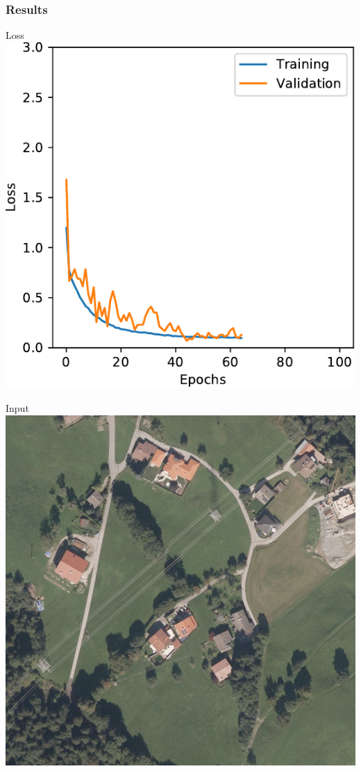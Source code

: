 \documentclass[usenames,dvipsnames,10pt]{beamer}
\begin{document}
\begin{frame}
\frametitle{Results}
\begin{minipage}[]{0.3\textwidth}
	\centering
	Loss
	\includegraphics[width=\textwidth]{graphics/loss03.pdf}
\end{minipage}
\hspace{0.25cm}
\begin{minipage}[]{0.3\textwidth}
	\centering
	Input
	\includegraphics[width=\textwidth]{graphics/aerial03.jpg}

\end{minipage}
\end{frame}
\end{document}

